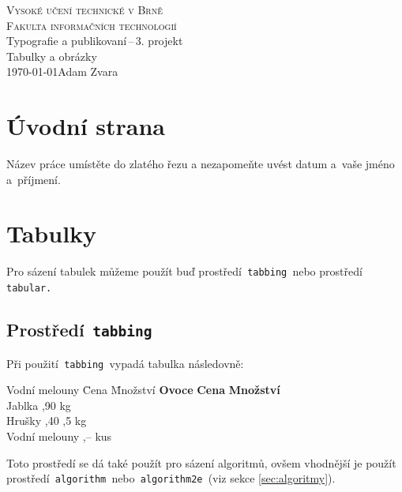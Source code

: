 \documentclass[11pt]{article}
\begin{document}
\begin{titlepage}
\begin{center}
    \Huge
    \textsc{Vysoké učení technické v Brně\\
    \huge
    Fakulta informačních technologií}\\
    \LARGE
    Typografie a publikovaní\,--\,3. projekt\\
    \Huge
    Tabulky a obrázky\\
    \Large
    \today \hfill Adam Zvara
\end{center}
\end{titlepage}

\section{Úvodní strana}
Název práce umístěte do zlatého řezu a nezapomeňte uvést  datum a~vaše jméno a~příjmení.

\section{Tabulky}
Pro sázení tabulek můžeme použít buď prostředí\texttt{ tabbing }nebo prostředí\texttt{ tabular.}

\subsection{Prostředí\texttt{ tabbing}}
Při použití\texttt{ tabbing }vypadá tabulka následovně:
\begin{tabbing}
    Vodní melouny \quad \= Cena \quad \= Množství \kill
    \textbf{Ovoce}\> \textbf{Cena} \> \textbf{Množství}\\
    Jablka        ,90  kg\\
    Hrušky        ,40 ,5 kg\\
    Vodní melouny ,--   kus\\
\end{tabbing}
Toto prostředí se dá také použít pro sázení algoritmů, ovšem vhodnější je použít prostředí\texttt{ algorithm }nebo\texttt{ algorithm2e }(viz sekce \ref{sec:algoritmy}).
\end{document}
